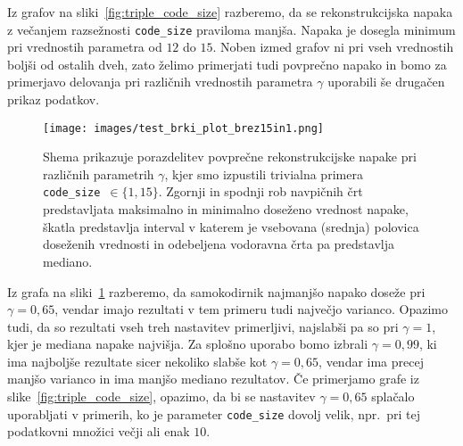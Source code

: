 \documentclass[12pt,a4paper,twoside]{article}
\theoremstyle{definition} %
\theoremstyle{plain} %
\numberwithin{equation}{section}  %
\begin{document}
Iz grafov na sliki~\ref{fig:triple_code_size} razberemo, da se rekonstrukcijska napaka z večanjem razsežnosti \texttt{code\_size} praviloma manjša.
Napaka je dosegla minimum pri vrednostih parametra od $12$ do $15$.
Noben izmed grafov ni pri vseh vrednostih boljši od ostalih dveh, 
zato želimo primerjati tudi povprečno napako in bomo za primerjavo delovanja pri različnih vrednostih parametra $\gamma$ uporabili še drugačen prikaz podatkov.

\begin{figure}[h]
	\centering
	\texttt{[image: images/test\_brki\_plot\_brez15in1.png]}
	\caption[Graf z brki.]{Shema prikazuje porazdelitev povprečne rekonstrukcijske napake pri različnih parametrih $\gamma$,
	kjer smo izpustili trivialna primera \texttt{code\_size}~$\in \{1,15\}$. %
	Zgornji in spodnji rob navpičnih črt predstavljata maksimalno in minimalno doseženo vrednost napake,
	škatla predstavlja interval v katerem je vsebovana (srednja) polovica doseženih vrednosti
	in odebeljena vodoravna črta pa predstavlja mediano.}
	\label{fig:boxplot}
\end{figure}

Iz grafa na sliki~\ref{fig:boxplot} razberemo, da samokodirnik najmanjšo napako doseže pri $\gamma=0,65$, vendar imajo rezultati v tem primeru tudi največjo varianco.
Opazimo tudi, da so rezultati vseh treh nastavitev primerljivi, najslabši pa so pri $\gamma=1$, kjer je mediana napake najvišja.
Za splošno uporabo bomo izbrali $\gamma=0,99$, ki ima najboljše rezultate sicer nekoliko slabše kot $\gamma=0,65$, vendar ima precej manjšo varianco in ima manjšo mediano rezultatov.
Če primerjamo grafe iz slike~\ref{fig:triple_code_size}, opazimo, da bi se nastavitev $\gamma=0,65$ splačalo uporabljati v primerih, 
ko je parameter \texttt{code\_size} dovolj velik, npr.\ pri tej podatkovni množici večji ali enak $10$.
\end{document}
